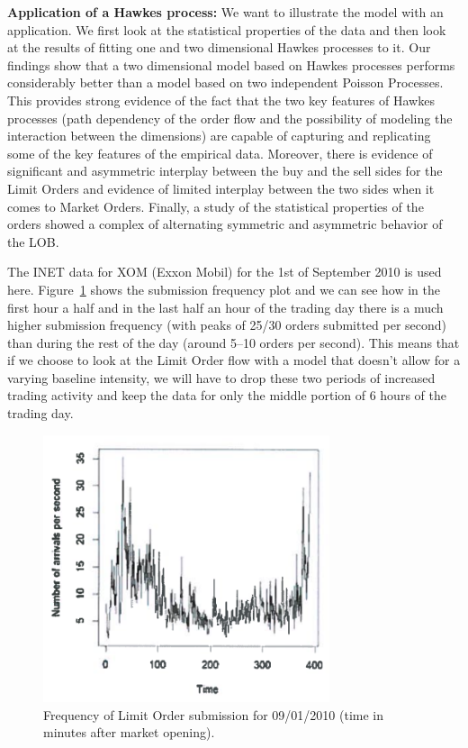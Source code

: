 \noindent\textbf{Application of a Hawkes process:} We want to illustrate the model with an application. We first look at the statistical properties of the data and then look at the results of fitting one and two dimensional Hawkes processes to it. Our findings show that a two dimensional model based on Hawkes processes performs considerably better than a model based on two independent Poisson Processes. This provides strong evidence of the fact that the two key features of Hawkes processes (path dependency of the order flow and the possibility of modeling the interaction between the dimensions) are capable of capturing and replicating some of the key features of the empirical data. Moreover, there is evidence of significant and asymmetric interplay between the buy and the sell sides for the Limit Orders and evidence of limited interplay between the two sides when it comes to Market Orders. Finally, a study of the statistical properties of the orders showed a complex of alternating symmetric and asymmetric behavior of the LOB. 


The INET data for XOM (Exxon Mobil) for the 1st of September 2010 is used here. Figure~\ref{fig:freqsubmitarrivals} shows the submission frequency plot and we can see how in the first hour a half and in the last half an hour of the trading day there is a much higher submission frequency (with peaks of 25/30 orders submitted per second) than during the rest of the day (around 5--10 orders per second). This means that if we choose to look at the Limit Order flow with a model that doesn't allow for a varying baseline intensity, we will have to drop these two periods of increased trading activity and keep the data for only the middle portion of 6 hours of the trading day.
	\begin{figure}[!ht]
   	\centering
   	\includegraphics[width=0.75\textwidth]{chapters/chapter_trade_data_models/figures/freqsubmit.png} 
   	\caption{Frequency of Limit Order submission for 09/01/2010 (time in minutes after market opening). \label{fig:freqsubmitarrivals}}
	\end{figure}


